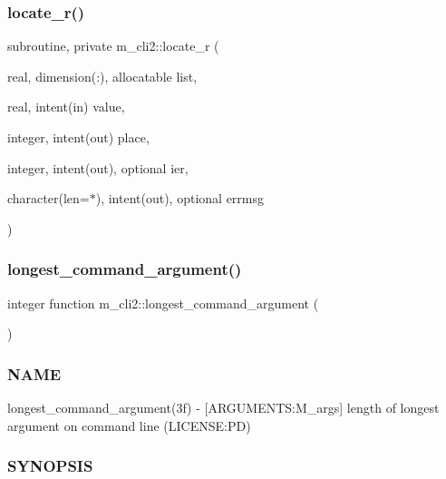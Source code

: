 \mbox{\label{namespacem__cli2_a2e12eb8c0ae6ce90b821141699e627df}} 
\subsubsection{\texorpdfstring{locate\+\_\+r()}{locate\_r()}}
{\footnotesize\ttfamily subroutine, private m\+\_\+cli2\+::locate\+\_\+r (\begin{DoxyParamCaption}\item[{real, dimension(\+:), allocatable}]{list,  }\item[{real, intent(in)}]{value,  }\item[{integer, intent(out)}]{place,  }\item[{integer, intent(out), optional}]{ier,  }\item[{character(len=$\ast$), intent(out), optional}]{errmsg }\end{DoxyParamCaption})\hspace{0.3cm}{\ttfamily [private]}}

\mbox{\label{namespacem__cli2_a7240f12031027172b87fde623bd77958}} 
\subsubsection{\texorpdfstring{longest\+\_\+command\+\_\+argument()}{longest\_command\_argument()}}
{\footnotesize\ttfamily integer function m\+\_\+cli2\+::longest\+\_\+command\+\_\+argument (\begin{DoxyParamCaption}{ }\end{DoxyParamCaption})\hspace{0.3cm}{\ttfamily [private]}}



\subsubsection*{N\+A\+ME}

longest\+\_\+command\+\_\+argument(3f) -\/ \mbox{[}A\+R\+G\+U\+M\+E\+N\+TS\+:M\+\_\+args\mbox{]} length of longest argument on command line (L\+I\+C\+E\+N\+SE\+:PD) \subsubsection*{S\+Y\+N\+O\+P\+S\+IS}

